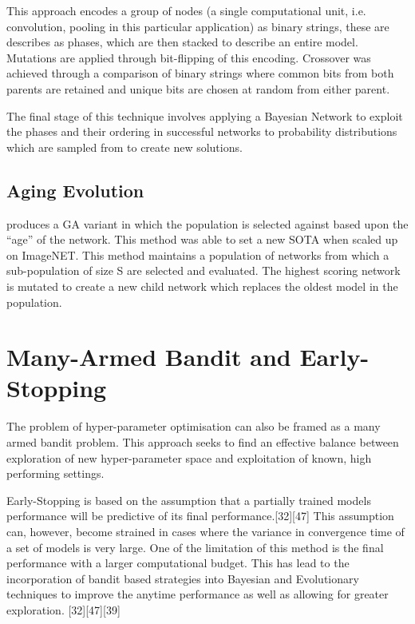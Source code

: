 \documentclass{article}
\begin{document}
		This approach encodes a group of nodes (a single computational unit, i.e. convolution, pooling in this particular application) as binary strings, these are describes as phases, which are then stacked to describe an entire model. Mutations are applied through bit-flipping of this encoding. Crossover was achieved through a comparison of binary strings where common bits from both parents are retained and unique bits are chosen at random from either parent.

		The final stage of this technique involves applying a Bayesian Network to exploit the phases and their ordering in successful networks to probability distributions which are sampled from to create new solutions.


	\subsection{Aging Evolution}

		\cite{42} produces a GA variant in which the population is selected against based upon the “age” of the network. This method was able to set a new SOTA when scaled up on ImageNET.
		This method maintains a population of networks from which a sub-population of size S are selected and evaluated. The highest scoring network is mutated to create a new child network which replaces the oldest model in the population.  




\section {Many-Armed Bandit and Early-Stopping}

	The problem of hyper-parameter optimisation can also be framed as a many armed bandit problem. This approach seeks to find an effective balance between exploration of new hyper-parameter space and exploitation of known, high performing settings.
	\par
	Early-Stopping is based on the assumption that a partially trained models performance will be predictive of its final performance.[32][47] This assumption can, however, become strained in cases where the variance in convergence time of a set of models is very large. One of the limitation of this method is the final performance with a larger computational budget. This has lead to the incorporation of bandit based strategies into Bayesian and Evolutionary techniques to improve the anytime performance as well as allowing for greater exploration. [32][47][39]
\end{document}
